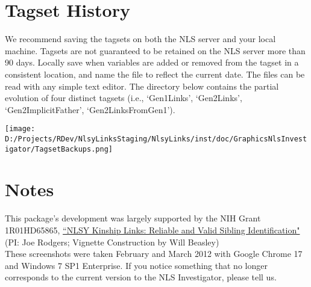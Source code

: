 \documentclass{article}\usepackage[]{graphicx}\usepackage[]{color}
\begin{document}
\section{Tagset History}
We recommend saving the tagsets on both the NLS server and your local machine.  Tagsets are not guaranteed to be retained on the NLS server more than 90 days.  Locally save when variables are added or removed from the tagset in a consistent location, and name the file to reflect the current date.  The files can be read with any simple text editor.  The directory below contains the partial evolution of four distinct tagsets (i.e., `Gen1Links', `Gen2Links', `Gen2ImplicitFather', `Gen2LinksFromGen1').

\texttt{[image: D:/Projects/RDev/NlsyLinksStaging/NlsyLinks/inst/doc/GraphicsNlsInvestigator/TagsetBackups.png]}

\section{Notes}
This package's development was largely supported by the NIH Grant 1R01HD65865, \href{http://taggs.hhs.gov/AwardDetail.cfm?s_Award_Num=R01HD065865&n_Prog_Office_Code=50}{``NLSY Kinship Links: Reliable and Valid Sibling Identification"} (PI: Joe Rodgers; Vignette Construction by Will Beasley)\\


These screenshots were taken February and March 2012 with Google Chrome 17 and Windows 7 SP1 Enterprise.  If you notice something that no longer corresponds to the current version to the NLS Investigator, please tell us.
\end{document}
